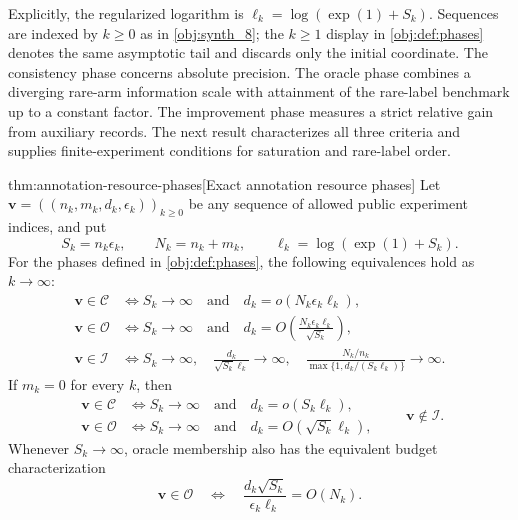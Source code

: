 Explicitly, the regularized logarithm is \(\ell_k=\log(\exp(1)+S_k)\). Sequences are indexed by \(k\ge0\) as in \cref{obj:synth_8}; the \(k\ge1\) display in \cref{obj:def:phases} denotes the same asymptotic tail and discards only the initial coordinate. The consistency phase  concerns absolute precision. The oracle phase  combines a diverging rare-arm information scale with attainment of the rare-label benchmark up to a constant factor. The improvement phase  measures a strict relative gain from auxiliary records. The next result characterizes all three criteria and supplies finite-experiment conditions for saturation and rare-label order.

\begin{theoremv}{thm:annotation-resource-phases}[Exact annotation resource phases]
Let \(\mathbf v=((n_k,m_k,d_k,\epsilon_k))_{k\ge0}\) be any sequence of allowed public experiment indices, and put
\[
S_k=n_k\epsilon_k,\qquad
N_k=n_k+m_k,\qquad
\ell_k=\log(\exp(1)+S_k).
\]
For the phases defined in \cref{obj:def:phases}, the following equivalences hold as \(k\to\infty\):
\[
\begin{aligned}
\mathbf v\in\mathcal C
&\Longleftrightarrow
S_k\longrightarrow\infty
\quad\text{and}\quad
d_k=o(N_k\epsilon_k\ell_k),\\
\mathbf v\in\mathcal O
&\Longleftrightarrow
S_k\longrightarrow\infty
\quad\text{and}\quad
d_k=O\!\left(\frac{N_k\epsilon_k\ell_k}{\sqrt{S_k}}\right),\\
\mathbf v\in\mathcal I
&\Longleftrightarrow
S_k\longrightarrow\infty,\quad
\frac{d_k}{\sqrt{S_k}\ell_k}\longrightarrow\infty,\quad
\frac{N_k/n_k}{\max\{1,d_k/(S_k\ell_k)\}}\longrightarrow\infty.
\end{aligned}
\]
If \(m_k=0\) for every \(k\), then
\[
\begin{aligned}
\mathbf v\in\mathcal C
&\Longleftrightarrow
S_k\longrightarrow\infty
\quad\text{and}\quad d_k=o(S_k\ell_k),\\
\mathbf v\in\mathcal O
&\Longleftrightarrow
S_k\longrightarrow\infty
\quad\text{and}\quad d_k=O(\sqrt{S_k}\ell_k),
\end{aligned}
\qquad
\mathbf v\notin\mathcal I.
\]
Whenever \(S_k\to\infty\), oracle membership also has the equivalent budget characterization
\[
\mathbf v\in\mathcal O
\quad\Longleftrightarrow\quad
\frac{d_k\sqrt{S_k}}{\epsilon_k\ell_k}=O(N_k).
\]


\end{theoremv}
